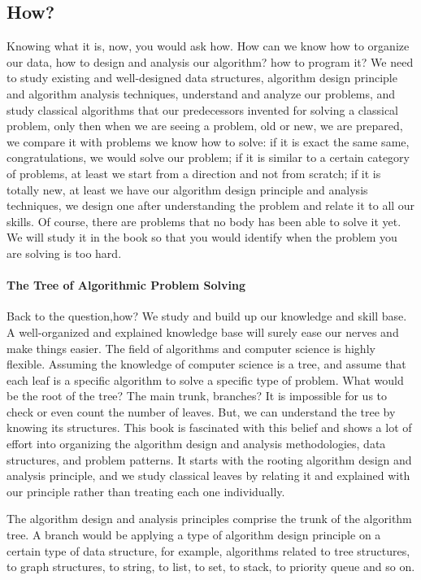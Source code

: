 \documentclass[../main.tex]{subfiles}
\begin{document}
\subsection{How?} 
Knowing what it is, now, you would ask how.  How can we know how to organize our data, how to design and analysis our algorithm? how to program it?  We need to study existing and well-designed data structures, algorithm design principle and algorithm analysis techniques, understand and analyze our problems, and study classical algorithms that our predecessors invented for solving a classical problem, only then when we are seeing a problem, old or new, we are prepared, we compare it with problems we know how to solve: if it is exact the same same, congratulations, we would solve our problem; if it is similar to a certain category of problems, at least we start from a direction and not from scratch; if it is totally new, at least we have our algorithm design principle and analysis techniques, we design one after understanding the problem and relate it to all our skills. Of course, there are problems that no body has been able to solve it yet. We will study it in the book so that you would identify when the problem you are solving is too hard. 

\paragraph{The Tree of Algorithmic  Problem Solving} Back to the question,how? We study and build up our knowledge and skill base. A well-organized and explained knowledge base will surely ease our nerves and make things easier.  The field of algorithms and computer science is highly flexible. Assuming the knowledge of computer science is a tree, and assume that each leaf is a specific algorithm to solve a specific type of problem. What would be the root of the tree? The main trunk, branches? It is impossible for us to check or even count the number of leaves. But, we can understand the tree by knowing its structures. This book is fascinated with this belief and shows a lot of effort into organizing the algorithm design and analysis methodologies, data structures, and problem patterns. It starts with  the rooting algorithm design and analysis principle, and we study classical leaves by relating it and explained with our principle rather than treating each one individually. 

The algorithm design and analysis principles comprise the trunk of the algorithm tree. A branch would be applying a type of algorithm design principle on a certain type of data structure, for example, algorithms related to tree structures, to graph structures, to string, to list, to set, to stack, to priority queue and so on. 
\end{document}

